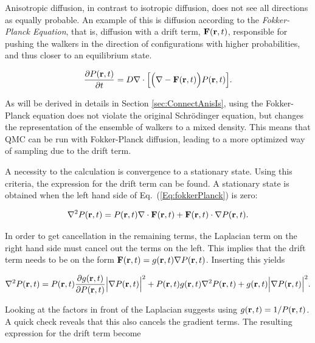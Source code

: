 Anisotropic diffusion, in contrast to isotropic diffusion, does not see all directions as equally probable. An example of this is diffusion according to the \textit{Fokker-Planck Equation}, that is, diffusion with a drift term, $\mathbf{F}(\mathbf{r}, t)$, responsible for pushing the walkers in the direction of configurations with higher probabilities, and thus closer to an equilibrium state.

\begin{equation}
 \label{Eq:fokkerPlanck}
 \frac{\partial P(\mathbf{r}, t)}{\partial t} = D\nabla\cdot\Big[\Big(\nabla - \mathbf{F}(\mathbf{r}, t)\Big) P(\mathbf{r}, t)\Big] .
\end{equation}

As will be derived in details in Section \ref{sec:ConnectAnisIs}, using the Fokker-Planck equation does not violate the original Schrödinger equation, but changes the representation of the ensemble of walkers to a mixed density. This means that QMC can be run with Fokker-Planck diffusion, leading to a more optimized way of sampling due to the drift term. 

A necessity to the calculation is convergence to a stationary state. Using this criteria, the expression for the drift term can be found. A stationary state is obtained when the left hand side of Eq.~(\ref{Eq:fokkerPlanck}) is zero:

\begin{equation*}
 \nabla^2 P(\mathbf{r}, t) = P(\mathbf{r}, t)\nabla\cdot\mathbf{ F}(\mathbf{ r}, t) + \mathbf{ F}(\mathbf{ r}, t) \cdot \nabla P(\mathbf{ r}, t).
\end{equation*}

In order to get cancellation in the remaining terms, the Laplacian term on the right hand side must cancel out the terms on the left. This implies that the drift term needs to be on the form $\mathbf{F}(\mathbf{ r}, t) = g(\mathbf{ r}, t)\nabla P(\mathbf{ r}, t)$. Inserting this yields

\begin{equation*}
  \nabla^2 P(\mathbf{ r}, t) = P(\mathbf{ r}, t)\frac{\partial g(\mathbf{ r}, t)}{\partial P(\mathbf{ r}, t)}\Big|\nabla P(\mathbf{ r}, t)\Big|^2
  + P(\mathbf{ r}, t)g(\mathbf{ r}, t)\nabla^2 P(\mathbf{ r}, t) + g(\mathbf{ r}, t) \Big|\nabla P(\mathbf{ r}, t)\Big|^2.
\end{equation*}

Looking at the factors in front of the Laplacian suggests using $g(\mathbf{ r}, t) = 1/P(\mathbf{ r}, t)$. A quick check reveals that this also cancels the gradient terms. The resulting expression for the drift term become

